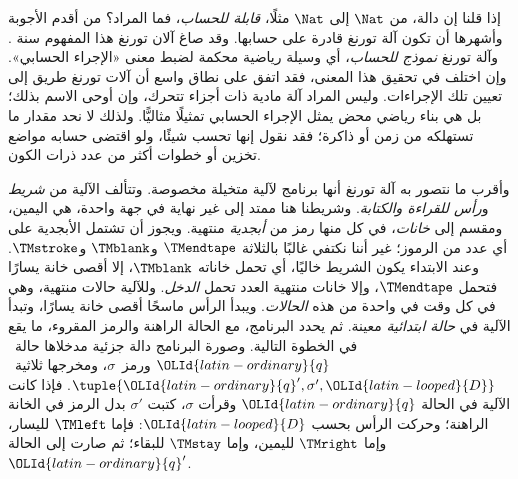 \documentclass[../../../include/open-logic-section]{subfiles}
\begin{document}

إذا قلنا إن دالة، من $\Nat$ إلى $\Nat$ مثلًا، \emph{قابلة للحساب}، فما المراد؟ من أقدم الأجوبة وأشهرها أن تكون آلة تورنغ قادرة على حسابها. وقد صاغ آلان تورنغ هذا المفهوم سنة . وآلة تورنغ \emph{نموذج للحساب}، أي وسيلة رياضية محكمة لضبط معنى «الإجراء الحسابي». وإن اختلف في تحقيق هذا المعنى، فقد اتفق على نطاق واسع أن آلات تورنغ طريق إلى تعيين تلك الإجراءات. وليس المراد آلة مادية ذات أجزاء تتحرك، وإن أوحى الاسم بذلك؛ بل هي بناء رياضي محض يمثل الإجراء الحسابي تمثيلًا مثاليًّا. ولذلك لا نحد مقدار ما تستهلكه من زمن أو ذاكرة؛ فقد نقول إنها تحسب شيئًا، ولو اقتضى حسابه مواضع تخزين أو خطوات أكثر من عدد ذرات الكون.

\begin{explain}
وأقرب ما نتصور به آلة تورنغ أنها برنامج لآلية متخيلة مخصوصة. وتتألف الآلية من \emph{شريط} و\emph{رأس للقراءة والكتابة}. وشريطنا هنا ممتد إلى غير نهاية في جهة واحدة، هي اليمين، ومقسم إلى \emph{خانات}، في كل منها رمز من \emph{أبجدية} منتهية. ويجوز أن تشتمل الأبجدية على أي عدد من الرموز؛ غير أننا نكتفي غالبًا بالثلاثة $\TMendtape$ و$\TMblank$ و$\TMstroke$. وعند الابتداء يكون الشريط خاليًا، أي تحمل خاناته $\TMblank$، إلا أقصى خانة يسارًا فتحمل $\TMendtape$، وإلا خانات منتهية العدد تحمل \emph{الدخل}. وللآلية حالات منتهية، وهي في كل وقت في واحدة من هذه \emph{الحالات}. ويبدأ الرأس ماسحًا أقصى خانة يسارًا، وتبدأ الآلية في \emph{حالة ابتدائية} معينة. ثم يحدد البرنامج، مع الحالة الراهنة والرمز المقروء، ما يقع في الخطوة التالية. وصورة البرنامج دالة جزئية مدخلاها حالة~$\OLId{latin-ordinary}{q}$ ورمز~$\sigma$، ومخرجها ثلاثية~$\tuple{\OLId{latin-ordinary}{q}',
  \sigma',\OLId{latin-looped}{D}}$. فإذا كانت الآلية في الحالة $\OLId{latin-ordinary}{q}$ وقرأت $\sigma$، كتبت $\sigma'$ بدل الرمز في الخانة الراهنة؛ وحركت الرأس بحسب $\OLId{latin-looped}{D}$: فإما $\TMleft$ لليسار، وإما $\TMright$ لليمين، وإما $\TMstay$ للبقاء؛ ثم صارت إلى الحالة~$\OLId{latin-ordinary}{q}'$.


\end{explain}
\end{document}
